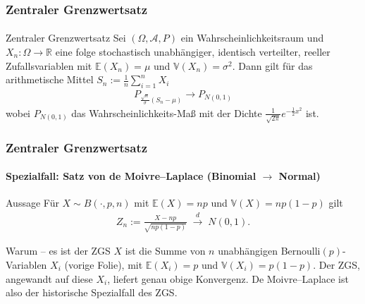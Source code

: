 \documentclass{beamer}
\begin{document}
\begin{frame}
    \frametitle{Zentraler Grenzwertsatz}
\framesubtitle{}


\begin{block}{Zentraler Grenzwertsatz}
Sei $(\Omega, \mathcal{A}, P)$ ein Wahrscheinlichkeitsraum und $X_n :  \Omega \to \mathbb{R}$  eine folge stochastisch unabhängiger, identisch verteilter, reeller Zufallsvariablen mit $\mathbb{E}(X_n) = \mu$ und $\mathbb{V}(X_n)= \sigma^2$. Dann gilt für das arithmetische Mittel $S_n:= \frac{1}{n} \sum_{i=1}^n X_i$
\begin{align*}
P_{ \frac{\sqrt{n}}{\sigma} (S_n-\mu)} \to P_{N(0,1)}
\end{align*}
wobei $ P_{N(0,1)}$ das Wahrscheinlichkeits-Maß mit der Dichte $ \frac {1}{ \sqrt{2\pi}}e^{- \frac {1}{2} x^2}$ ist.
\end{block}

 \end{frame}


\begin{frame}
    \frametitle{Zentraler Grenzwertsatz}
\framesubtitle{Spezialfall: Satz von de Moivre--Laplace (Binomial $\to$ Normal)}

\begin{block}{Aussage}
Für $X \sim B(\cdot,p,n)$ mit $\mathbb{E}(X)=np$ und $\mathbb{V}(X)=np(1-p)$ gilt
\begin{align*}
Z_n := \frac{X-np}{\sqrt{np(1-p)}} \;\xrightarrow{\;d\;}\; N(0,1).
\end{align*}
\end{block}

\begin{block}{Warum -- es ist der ZGS}
$X$ ist die Summe von $n$ unabhängigen Bernoulli$(p)$-Variablen $X_i$ (vorige Folie), mit $\mathbb{E}(X_i)=p$ und $\mathbb{V}(X_i)=p(1-p)$. Der ZGS, angewandt auf diese $X_i$, liefert genau obige Konvergenz. De Moivre--Laplace ist also der historische Spezialfall des ZGS.
\end{block}
 \end{frame}
\end{document}
